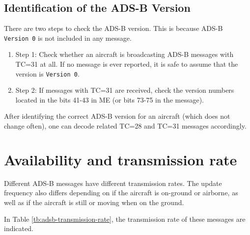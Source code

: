\subsection{Identification of the ADS-B Version}

There are two steps to check the ADS-B version. This is because ADS-B \texttt{Version\ 0} is not included in any message.

\begin{enumerate}
\def\labelenumi{\arabic{enumi}.}
\item
  Step 1: Check whether an aircraft is broadcasting ADS-B messages with   TC=31 at all. If no message is ever reported, it is safe to assume that the version is \texttt{Version\ 0}.
\item
  Step 2: If messages with TC=31 are received, check the version numbers located in the bits 41-43 in ME (or bits 73-75 in the message).
\end{enumerate}

After identifying the correct ADS-B version for an aircraft (which does not change often), one can decode related TC=28 and TC=31 messages accordingly.


\section{Availability and transmission rate}

Different ADS-B messages have different transmission rates. The update frequency also differs depending on if the aircraft is on-ground or airborne, as well as if the aircraft is still or moving when on the ground.

In Table \ref{tb:adsb-transmission-rate}, the transmission rate of these messages are indicated.

